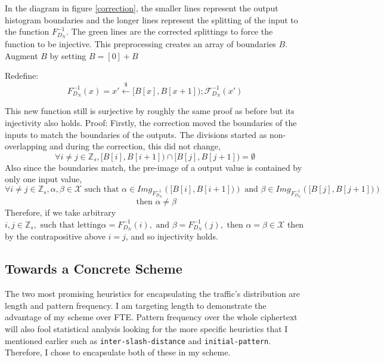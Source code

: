\documentclass[ %
                    author={Samuel Russell},
                supervisor={Prof. Bogdan Warinschi},
                    degree={MEng},
                     title={Innocuous Ciphertexts},
                  subtitle={The DE-CENSOR Scheme},
                      type={Research},
                      year={2018} ]{dissertation}
\begin{document}
In the diagram in figure \ref{correction}, the smaller lines represent the output histogram boundaries and the longer lines represent the splitting of the input to the function $F^{-1}_{D_N}$.
The green lines are the corrected splittings to force the function to be injective. This preprocessing creates an array of boundaries $B$. Augment $B$ by setting $B = [0] + B$

Redefine:
$$F^{-1}_{D_N}(x) = x' \xleftarrow{\$} [B[x], B[x+1]); \mathcal{F}^{-1}_{D_N}(x')$$

This new function still is surjective by roughly the same proof as before but its injectivity also holds.
Proof:
Firstly, the correction moved the boundaries of the inputs to match the boundaries of the outputs.
The divisions started as non-overlapping and during the correction, this did not change,
$$\forall i \neq j \in \mathbb{Z}_s, \big[ B[i],B[i+1] \big) \cap \big[ B[j],B[j+1] \big) = \emptyset$$
Also since the boundaries match, the pre-image of a output value is contained by only one input value,
$$ \forall i \neq j \in \mathbb{Z}_s, \alpha,\beta \in \mathcal{X} \text{ such that } \alpha \in Img_{F^{-1}_{D_N}}(\big[ B[i],B[i+1] \big)) \text{ and } \beta \in Img_{F^{-1}_{D_N}}(\big[ B[j],B[j+1] \big))$$
$$\text{ then } \alpha \neq \beta$$
Therefore, if we take arbitrary $i, j \in \mathbb{Z}_s, \text{ such that letting} \alpha = F^{-1}_{D_N}(i), \text{ and } \beta = F^{-1}_{D_N}(j), \text{ then } \alpha = \beta \in \mathcal{X}$ then by the contrapositive above $i=j$, and so injectivity holds.

\subsection{Towards a Concrete Scheme}

The two most promising heuristics for encapsulating the traffic's distribution are length and pattern frequency.
I am targeting length to demonstrate the advantage of my scheme over FTE. Pattern frequency over the whole ciphertext will also fool statistical analysis looking for the more specific heuristics that I mentioned earlier such as \texttt{inter-slash-distance} and \texttt{initial-pattern}.
Therefore, I chose to encapsulate both of these in my scheme.
\end{document}
